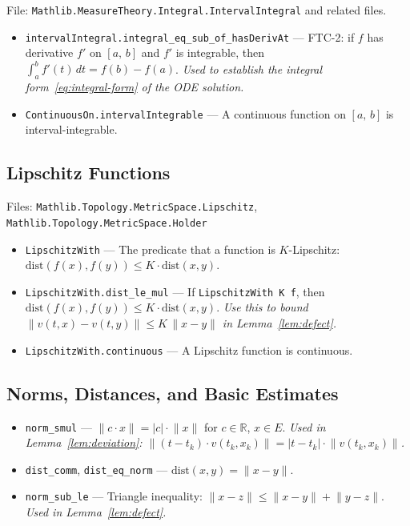 \documentclass[11pt,a4paper]{article}
\theoremstyle{definition}
\newcommand{\norm}[1]{\lVert #1 \rVert}
\newcommand{\abs}[1]{\lvert #1 \rvert}
\newcommand{\R}{\mathbb{R}}
\newcommand{\Icc}[2]{[#1,\, #2]}
\newcommand{\dist}{\mathrm{dist}}
\begin{document}
File: \texttt{Mathlib.MeasureTheory.Integral.IntervalIntegral}
and related files.

\begin{itemize}
  \item \texttt{intervalIntegral.integral\_eq\_sub\_of\_hasDerivAt}
    --- FTC-2: if $f$ has derivative $f'$ on $\Icc{a}{b}$ and $f'$
    is integrable, then $\int_a^b f'(t)\,dt = f(b) - f(a)$.
    \emph{Used to establish the integral form~\eqref{eq:integral-form}
    of the ODE solution.}

  \item \texttt{ContinuousOn.intervalIntegrable} --- A continuous
    function on $\Icc{a}{b}$ is interval-integrable.
\end{itemize}


\subsection{Lipschitz Functions}
\label{ssec:lipschitz}

Files: \texttt{Mathlib.Topology.MetricSpace.Lipschitz},
\texttt{Mathlib.Topology.MetricSpace.Holder}

\begin{itemize}
  \item \texttt{LipschitzWith} --- The predicate that a function
    is $K$-Lipschitz: $\dist(f(x), f(y)) \le K \cdot \dist(x, y)$.

  \item \texttt{LipschitzWith.dist\_le\_mul} ---
    If \texttt{LipschitzWith K f}, then
    $\dist(f(x), f(y)) \le K \cdot \dist(x, y)$.
    \emph{Use this to bound $\norm{v(t,x) - v(t,y)} \le K\,\norm{x-y}$
    in Lemma~\ref{lem:defect}.}

  \item \texttt{LipschitzWith.continuous} --- A Lipschitz function
    is continuous.
\end{itemize}


\subsection{Norms, Distances, and Basic Estimates}
\label{ssec:norms}

\begin{itemize}
  \item \texttt{norm\_smul} ---
    $\norm{c \cdot x} = \abs{c} \cdot \norm{x}$ for $c \in \R$,
    $x \in E$.
    \emph{Used in Lemma~\ref{lem:deviation}:
    $\norm{(t - t_k) \cdot v(t_k, x_k)} = \abs{t - t_k} \cdot \norm{v(t_k, x_k)}$.}

  \item \texttt{dist\_comm}, \texttt{dist\_eq\_norm} ---
    $\dist(x, y) = \norm{x - y}$.

  \item \texttt{norm\_sub\_le} ---
    Triangle inequality: $\norm{x - z} \le \norm{x - y} + \norm{y - z}$.
    \emph{Used in Lemma~\ref{lem:defect}.}
\end{itemize}
\end{document}
